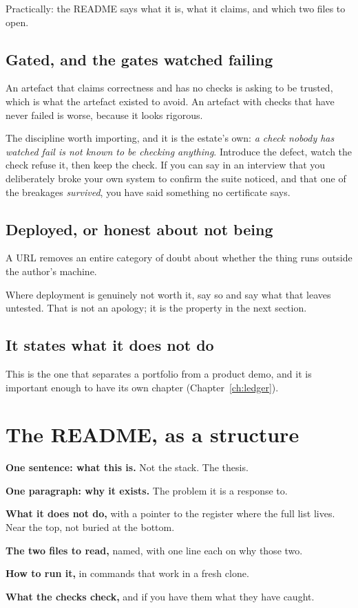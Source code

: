 Practically: the README says what it is, what it claims, and which two files to
open. 

\subsection*{Gated, and the gates watched failing}

An artefact that claims correctness and has no checks is asking to be trusted,
which is what the artefact existed to avoid. An artefact with checks that have
never failed is worse, because it looks rigorous.

The discipline worth importing, and it is the estate's own: \emph{a check nobody
has watched fail is not known to be checking anything}. Introduce the defect,
watch the check refuse it, then keep the check. If you can say in an interview
that you deliberately broke your own system to confirm the suite noticed, and
that one of the breakages \emph{survived}, you have said something no
certificate says.

\subsection*{Deployed, or honest about not being}

 A URL
removes an entire category of doubt about whether the thing runs outside the
author's machine.

Where deployment is genuinely not worth it, say so and say what that leaves
untested. That is not an apology; it is the property in the next section.

\subsection*{It states what it does not do}

This is the one that separates a portfolio from a product demo, and it is
important enough to have its own chapter (Chapter~\ref{ch:ledger}).

\section{The README, as a structure}

\begin{kitmethod}
\textbf{One sentence: what this is.} Not the stack. The thesis.

\textbf{One paragraph: why it exists.} The problem it is a response to.

\textbf{What it does not do,} with a pointer to the register where the full list
lives. Near the top, not buried at the bottom.

\textbf{The two files to read,} named, with one line each on why those two.

\textbf{How to run it,} in commands that work in a fresh clone.

\textbf{What the checks check,} and \dash{} if you have them \dash{} what they
have caught.
\end{kitmethod}

